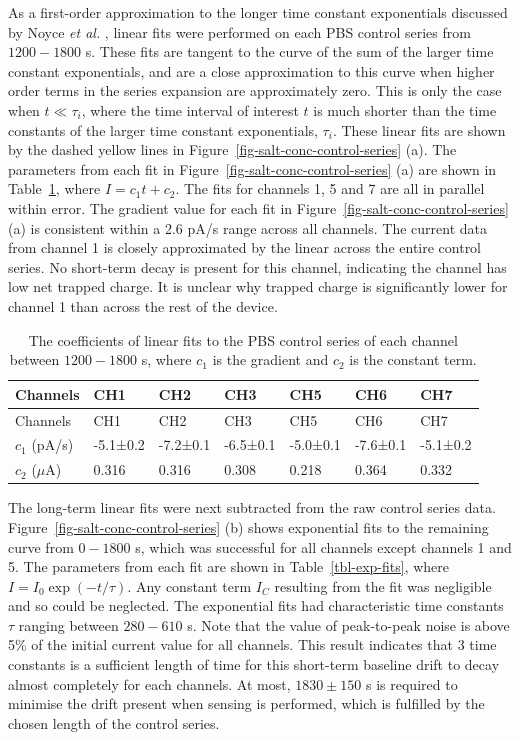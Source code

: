 \documentclass[
  a4paper,
]{scrbook}
\begin{document}
As a first-order approximation to the longer time constant exponentials
discussed by Noyce \emph{et al.} \autocite{Noyce2019}, linear fits were
performed on each PBS control series from \(1200-1800\) s. These fits
are tangent to the curve of the sum of the larger time constant
exponentials, and are a close approximation to this curve when higher
order terms in the series expansion are approximately zero. This is only
the case when \(t\ll\tau_i\), where the time interval of interest \(t\)
is much shorter than the time constants of the larger time constant
exponentials, \(\tau_i\). These linear fits are shown by the dashed
yellow lines in Figure~\ref{fig-salt-conc-control-series} (a). The
parameters from each fit in Figure~\ref{fig-salt-conc-control-series}
(a) are shown in Table~\ref{tbl-linear-fits}, where \(I = c_1t + c_2\).
The fits for channels 1, 5 and 7 are all in parallel within error. The
gradient value for each fit in Figure~\ref{fig-salt-conc-control-series}
(a) is consistent within a 2.6 pA/s range across all channels. The
current data from channel 1 is closely approximated by the linear across
the entire control series. No short-term decay is present for this
channel, indicating the channel has low net trapped charge. It is
unclear why trapped charge is significantly lower for channel 1 than
across the rest of the device.

\hypertarget{tbl-linear-fits}{}
\begin{longtable}[]{@{}lllllll@{}}
\caption{\label{tbl-linear-fits}The coefficients of linear fits to the
PBS control series of each channel between \(1200-1800\) s, where
\(c_1\) is the gradient and \(c_2\) is the constant term.\\
}\tabularnewline
\toprule\noalign{}
Channels & CH1 & CH2 & CH3 & CH5 & CH6 & CH7 \\
\midrule\noalign{}
\endfirsthead
\toprule\noalign{}
Channels & CH1 & CH2 & CH3 & CH5 & CH6 & CH7 \\
\midrule\noalign{}
\endhead
\bottomrule\noalign{}
\endlastfoot
\(c_1\) (pA/s) & -5.1±0.2 & -7.2±0.1 & -6.5±0.1 & -5.0±0.1 & -7.6±0.1 &
-5.1±0.2 \\
\(c_2\) (\(\mu\)A) & 0.316 & 0.316 & 0.308 & 0.218 & 0.364 & 0.332 \\
\end{longtable}

The long-term linear fits were next subtracted from the raw control
series data. Figure~\ref{fig-salt-conc-control-series} (b) shows
exponential fits to the remaining curve from \(0-1800\) s, which was
successful for all channels except channels 1 and 5. The parameters from
each fit are shown in Table~\ref{tbl-exp-fits}, where
\(I = I_0\exp(-t/\tau)\). Any constant term \(I_C\) resulting from the
fit was negligible and so could be neglected. The exponential fits had
characteristic time constants \(\tau\) ranging between \(280 - 610\) s.
Note that the value of peak-to-peak noise is above 5\% of the initial
current value for all channels. This result indicates that 3 time
constants is a sufficient length of time for this short-term baseline
drift to decay almost completely for each channels. At most,
\(1830\pm150\) s is required to minimise the drift present when sensing
is performed, which is fulfilled by the chosen length of the control
series.
\end{document}
